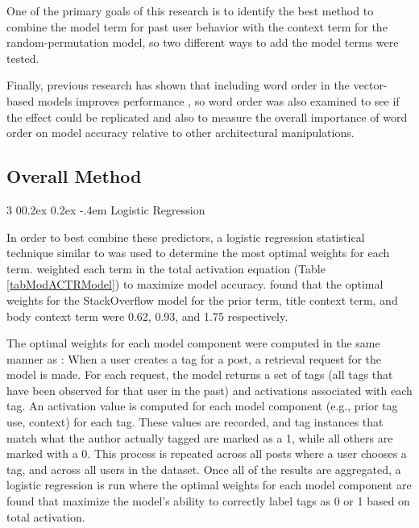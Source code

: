 \documentclass[man,floatsintext,donotrepeattitle]{apa6}
\makeatletter
\renewcommand{\subsubsection}{%
  \@startsection
  {subsubsection}%
  {3}%
  {\parindent}%
  {0\baselineskip \@plus 0.2ex \@minus 0.2ex}%
  {-.4em}%
  {\normalfont\normalsize\bfseries\addperi}}
\makeatother
\begin{document}
One of the primary goals of this research is to identify the best method to combine the model term for past user behavior with the context term for the random-permutation model,
so two different ways to add the model terms were tested.

Finally, previous research has shown that including word order in the vector-based models improves performance \parencites{Jones2007, Sahlgren2008},
so word order was also examined to see if the effect could be replicated and also to measure the overall importance of word order on model accuracy relative to other architectural manipulations.

\subsection{Overall Method}

\subsubsection{Logistic Regression}

In order to best combine these predictors, a logistic regression statistical technique similar to \textcite{Stanley2013} was used to determine the most optimal weights for each term.
\textcite{Stanley2013} weighted each term in the total activation equation (Table \ref{tabModACTRModel}) to maximize model accuracy.
\citeauthor{Stanley2013} found that the optimal weights for the StackOverflow model for the prior term, title context term, and body context term were \num{.62}, \num{.93}, and \num{1.75} respectively.

The optimal weights for each model component were computed in the same manner as \textcite{Stanley2013}:
When a user creates a tag for a post, a retrieval request for the model is made.
For each request, the model returns a set of tags (all tags that have been observed for that user in the past) and activations associated with each tag.
An activation value is computed for each model component (e.g., prior tag use, context) for each tag.
These values are recorded, and tag instances that match what the author actually tagged are marked as a 1, while all others are marked with a 0.
This process is repeated across all posts where a user chooses a tag, and across all users in the dataset.
Once all of the results are aggregated, a logistic regression is run where the optimal weights for each model component are found that maximize the model's ability to correctly label tags as 0 or 1 based on total activation.
\end{document}
